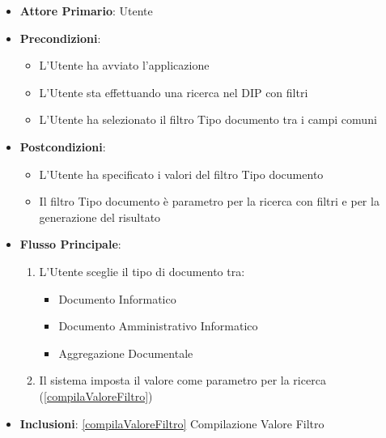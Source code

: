 \begin{itemize}
      \item \textbf{Attore Primario}: Utente
      \item \textbf{Precondizioni}: \begin{itemize}
            \item L'Utente ha avviato l'applicazione
            \item L'Utente sta effettuando una ricerca nel DIP con filtri
            \item L'Utente ha selezionato il filtro Tipo documento tra i campi comuni
      \end{itemize}
      \item \textbf{Postcondizioni}: \begin{itemize}
            \item L'Utente ha specificato i valori del filtro Tipo documento
            \item Il filtro Tipo documento è parametro per la ricerca con filtri e per la generazione del risultato
      \end{itemize}
      \item \textbf{Flusso Principale}:
      \begin{enumerate}
            \item L'Utente sceglie il tipo di documento tra: \begin{itemize}
                \item Documento Informatico
                \item Documento Amministrativo Informatico
                \item Aggregazione Documentale
            \end{itemize}
            \item Il sistema imposta il valore come parametro per la ricerca (\ref{compilaValoreFiltro})
      \end{enumerate}
      \item \textbf{Inclusioni}: \ref{compilaValoreFiltro} Compilazione Valore Filtro
\end{itemize}

